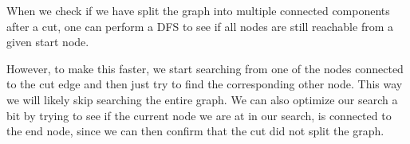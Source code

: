 When we check if we have split the graph into multiple connected components after a cut, one can perform a DFS to see if all nodes are still reachable from a given start node. 

However, to make this faster, we start searching from one of the nodes connected to the cut edge and then just try to find the corresponding other node. This way we will likely skip searching the entire graph. We can also optimize our search a bit by trying to see if the current node we are at in our search, is connected to the end node, since we can then confirm that the cut did not split the graph.


